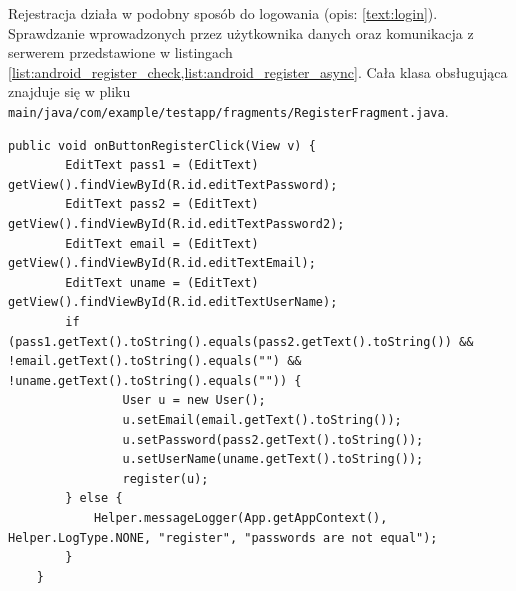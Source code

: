 Rejestracja działa w podobny sposób do logowania (opis: \ref{text:login}). Sprawdzanie wprowadzonych przez użytkownika danych oraz komunikacja z serwerem przedstawione w listingach \ref{list:android_register_check,list:android_register_async}. Cała klasa obsługująca znajduje się w pliku \texttt{main/java/com/example/testapp/fragments/RegisterFragment.java}.
\begin{lstlisting}[label=list:android_register_check,caption=Obsługa przycisku register,basicstyle=\tiny\ttfamily]
    public void onButtonRegisterClick(View v) {
        EditText pass1 = (EditText) getView().findViewById(R.id.editTextPassword);
        EditText pass2 = (EditText) getView().findViewById(R.id.editTextPassword2);
        EditText email = (EditText) getView().findViewById(R.id.editTextEmail);
        EditText uname = (EditText) getView().findViewById(R.id.editTextUserName);
        if (pass1.getText().toString().equals(pass2.getText().toString()) && !email.getText().toString().equals("") && !uname.getText().toString().equals("")) {
                User u = new User();
                u.setEmail(email.getText().toString());
                u.setPassword(pass2.getText().toString());
                u.setUserName(uname.getText().toString());
                register(u);
        } else {
            Helper.messageLogger(App.getAppContext(), Helper.LogType.NONE, "register", "passwords are not equal");
        }
    }
\end{lstlisting}
